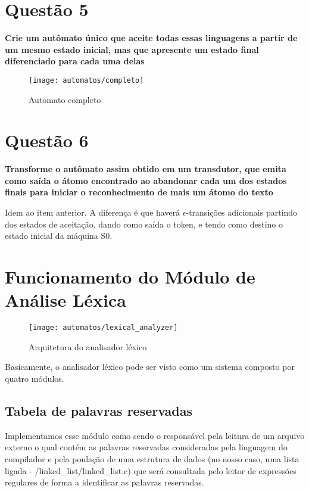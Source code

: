\section{Questão 5}

\textbf{Crie um autômato único que aceite todas essas linguagens a partir de um mesmo estado inicial, mas que apresente um estado final diferenciado para cada uma delas}

\begin{figure}[H]
  \caption{Automato completo}
  \centering
    \texttt{[image: automatos/completo]}
\end{figure}

\section{Questão 6}

\textbf{Transforme o autômato assim obtido em um transdutor, que emita como saída o átomo encontrado ao abandonar cada um dos estados finais para iniciar o reconhecimento de mais um átomo do texto}

Idem ao item anterior. A diferença é que haverá $\epsilon$-transições adicionais partindo dos estados de aceitação, dando como saída o token, e tendo como destino o estado inicial da máquina S0.

\section{Funcionamento do Módulo de Análise Léxica}

\begin{figure}[H]
  \caption{Arquitetura do analisador léxico}
  \centering
    \texttt{[image: automatos/lexical\_analyzer]}
\end{figure}

Basicamente, o analisador léxico pode ser visto como um sistema composto por quatro módulos.

\subsection{Tabela de palavras reservadas}

Implementamos esse módulo como sendo o responsável pela leitura de um arquivo externo o qual contém as palavras reservadas consideradas pela linguagem do compilador e pela poulação de uma estrutura de dados (no nosso caso, uma lista ligada - /linked\_list/linked\_list.c) que será consultada pelo leitor de expressões regulares de forma a identificar as palavras reservadas.

